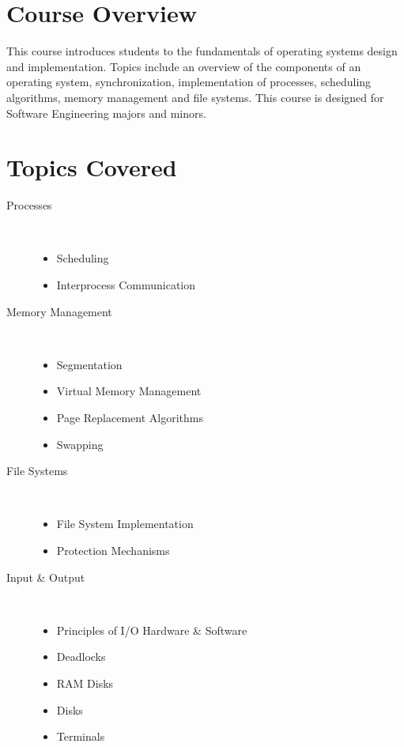 \documentclass[12pt,a4paper,oneside]{article}
\begin{document}
    \section{Course Overview}

        This course introduces students to the fundamentals of operating systems design and implementation. Topics include an overview of the components of an operating system, synchronization, implementation of processes, scheduling algorithms, memory management and file systems. This course is designed for Software Engineering majors and minors.

    \section{Topics Covered}

        \begin{description}
            \item[Processes]\hfill\\
                 \begin{itemize}
                    \item Scheduling
                    \item Interprocess Communication
                 \end{itemize}
            \item[Memory Management]\hfill\\
                 \begin{itemize}
                    \item Segmentation
                    \item Virtual Memory Management
                    \item Page Replacement Algorithms 
                    \item Swapping
                 \end{itemize}
            \item[File Systems]\hfill\\
                \begin{itemize}
                    \item File System Implementation
                    \item Protection Mechanisms
                 \end{itemize}
            \item[Input \& Output]\hfill\\
                \begin{itemize}
                   \item Principles of I/O Hardware \& Software
                   \item Deadlocks
                   \item RAM Disks
                   \item Disks
                   \item Terminals
                \end{itemize}
        \end{description}
\end{document}
